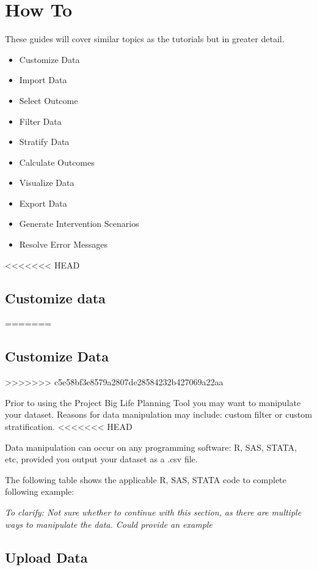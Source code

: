 \documentclass[]{book}
\providecommand{\tightlist}{%
  \setlength{\itemsep}{0pt}\setlength{\parskip}{0pt}}
\begin{document}
\chapter{How To}\label{howto}

These guides will cover similar topics as the tutorials but in greater
detail.

\begin{itemize}
\tightlist
\item
  Customize Data
\item
  Import Data
\item
  Select Outcome
\item
  Filter Data
\item
  Stratify Data
\item
  Calculate Outcomes
\item
  Visualize Data
\item
  Export Data
\item
  Generate Intervention Scenarios
\item
  Resolve Error Messages
\end{itemize}

<<<<<<< HEAD
\section{Customize data}\label{customize-data}
=======
\section{Customize Data}\label{customize-data}
>>>>>>> c5e58bf3e8579a2807de28584232b427069a22aa

Prior to using the Project Big Life Planning Tool you may want to
manipulate your dataset. Reasons for data manipulation may include:
custom filter or custom stratification.
<<<<<<< HEAD

Data manipulation can occur on any programming software: R, SAS, STATA,
etc, provided you output your dataset as a .csv file.

The following table shows the applicable R, SAS, STATA code to complete
following example:

\emph{To clarify: Not sure whether to continue with this section, as
there are multiple ways to manipulate the data. Could provide an
example}

\section{Upload Data}\label{upload-data}
\end{document}
